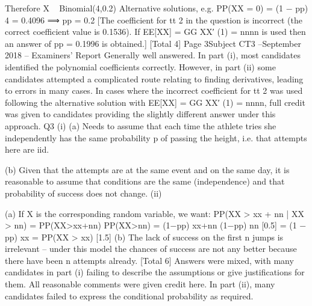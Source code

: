 Therefore X ~ Binomial(4,0.2)
Alternative solutions, e.g. PP(XX = 0) = (1 − pp) 4 = 0.4096 ⟹ pp = 0.2
[The coefficient for tt 2 in the question is incorrect (the correct coefficient value is 0.1536). If
EE[XX] = GG XX′ (1) = nnnn is used then an answer of pp = 0.1996 is obtained.]
[Total 4]
Page 3Subject CT3  –September 2018 – Examiners’ Report
Generally well answered. In part (i), most candidates identified the
polynomial coefficients correctly. However, in part (ii) some
candidates attempted a complicated route relating to finding
derivatives, leading to errors in many cases.
In cases where the incorrect coefficient for tt 2 was used following the
alternative solution with EE[XX] = GG XX′ (1) = nnnn, full credit was given to
candidates providing the slightly different answer under this approach.
Q3
(i)
(a) Needs to assume that each time the athlete tries she independently has the same
probability p of passing the height, i.e. that attempts here are iid.

(b) Given that the attempts are at the same event and on the same day,
it is reasonable to assume that conditions are the same (independence) and that
probability of success does not change.
(ii)

(a) If X is the corresponding random variable, we want:
PP(XX > xx + nn | XX > nn)
=
PP(XX>xx+nn)
PP(XX>nn)
=
(1−pp) xx+nn
(1−pp) nn
[0.5]
= (1 − pp) xx = PP(XX > xx)
[1.5]
(b) The lack of success on the first n jumps is irrelevant – under this model the
chances of success are not any better because there have been n attempts already. 
[Total 6]
Answers were mixed, with many candidates in part (i) failing to
describe the assumptions or give justifications for them. All reasonable
comments were given credit here. In part (ii), many candidates failed to
express the conditional probability as required.
